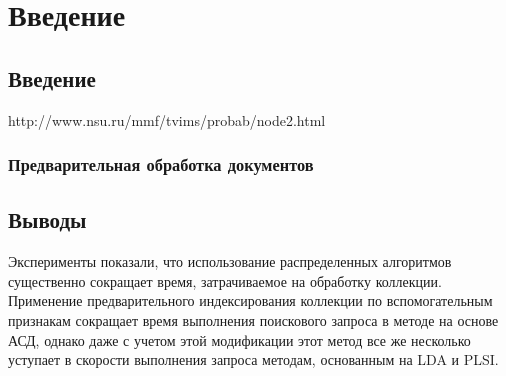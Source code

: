 \documentclass[12pt]{report}
\begin{document}

\textheight=23.0cm


\newpage

\onehalfspacing 


\tableofcontents
\thispagestyle{empty}





\newpage

\chapter*{Введение}


\section{Введение}


http://www.nsu.ru/mmf/tvims/probab/node2.html

\subsection{Предварительная обработка документов}


\section{Выводы}

Эксперименты показали, что использование распределенных алгоритмов существенно сокращает время, затрачиваемое на обработку коллекции. Применение предварительного индексирования коллекции по вспомогательным признакам сокращает время выполнения поискового запроса в методе на основе АСД, однако даже с учетом этой модификации этот метод все же несколько уступает в скорости выполнения запроса методам, основанным на LDA и PLSI. 
\end{document}
